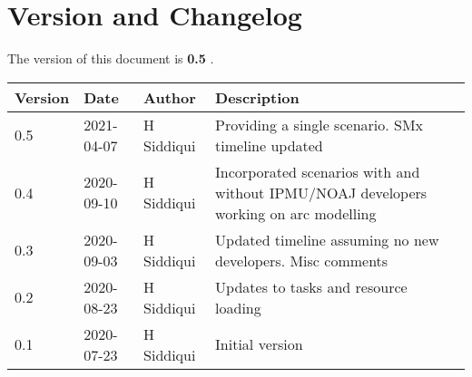 \section{Version and Changelog}

The version of this document is {\bf 0.5} .

\begin{table}[H]
    \begin{tabular}{|l|l|l|p{10cm}| }
    \hline
    {\bf Version} & {\bf Date} & {\bf Author} & {\bf Description} \\ \hline
    0.5 & 2021-04-07 & H Siddiqui & Providing a single scenario. SMx timeline updated\\ \hline
    0.4 & 2020-09-10 & H Siddiqui & Incorporated scenarios with and without IPMU/NOAJ developers working on arc modelling\\ \hline
    0.3 & 2020-09-03 & H Siddiqui & Updated timeline assuming no new developers. Misc comments\\ \hline
    0.2 & 2020-08-23 & H Siddiqui & Updates to tasks and resource loading \\ \hline
    0.1 & 2020-07-23 & H Siddiqui & Initial version \\ \hline
    \end{tabular}
\end{table}
